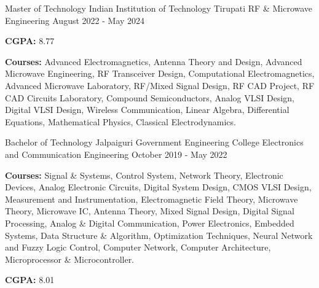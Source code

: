 

\begin{cventries}

  \cventry
    {Master of Technology} %
    {Indian Institution of Technology Tirupati} %
    {RF \& Microwave Engineering } %
    {August 2022 - May 2024} %
    {
      \begin{cvitems} %
        \item {\textbf{CGPA:} 8.77}
        \item {\textbf{Courses:} Advanced Electromagnetics, Antenna Theory and Design, Advanced Microwave Engineering, RF Transceiver Design, Computational Electromagnetics, Advanced Microwave Laboratory, RF/Mixed Signal Design, RF CAD Project, RF CAD Circuits Laboratory, Compound Semiconductors, Analog VLSI Design, Digital VLSI Design, Wireless Communication, Linear Algebra, Differential Equations, Mathematical Physics, Classical Electrodynamics.}
      \end{cvitems}
    }
    
  \cventry
    {Bachelor of Technology} %
    {Jalpaiguri Government Engineering College} %
    {Electronics and Communication Engineering} %
    {October 2019 - May 2022} %
    {
      \begin{cvitems} %
        \item {\textbf{Courses:} Signal \& Systems, Control System, Network Theory, Electronic Devices, Analog Electronic Circuits, Digital System Design, CMOS VLSI Design, Measurement and Instrumentation, Electromagnetic Field Theory, Microwave Theory, Microwave IC, Antenna Theory, Mixed Signal Design, Digital Signal Processing, Analog \& Digital Communication, Power Electronics, Embedded Systems, Data Structure \& Algorithm, Optimization Techniques, Neural Network and Fuzzy Logic Control, Computer Network, Computer Architecture, Microprocessor \& Microcontroller.}
        \item {\textbf{CGPA:} 8.01}
      \end{cvitems}
    }


\end{cventries}
